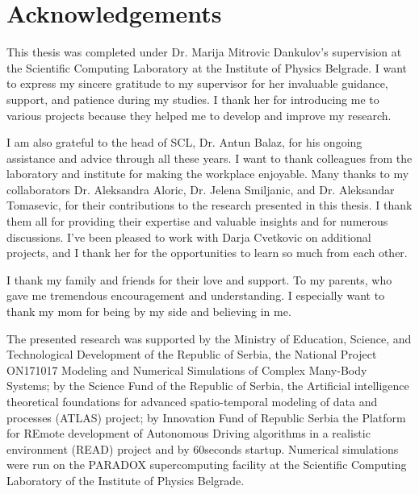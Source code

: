 
\normalsize
\chapter{Acknowledgements}

This thesis was completed under Dr. Marija Mitrovic Dankulov's supervision at the Scientific Computing Laboratory at the Institute of Physics Belgrade. I want to express my sincere gratitude to my supervisor for her invaluable guidance, support, and patience during my studies. I thank her for introducing me to various projects because they helped me to develop and improve my research. 

I am also grateful to the head of SCL, Dr. Antun Balaz, for his ongoing assistance and advice through all these years. I want to thank colleagues from the laboratory and institute for making the workplace enjoyable. Many thanks to my collaborators Dr. Aleksandra Aloric, Dr. Jelena Smiljanic, and Dr. Aleksandar Tomasevic, for their contributions to the research presented in this thesis. I thank them all for providing their expertise and valuable insights and for numerous discussions. I've been pleased to work with Darja Cvetkovic on additional projects, and I thank her for the opportunities to learn so much from each other.

I thank my family and friends for their love and support. To my parents, who gave me tremendous encouragement and understanding. I especially want to thank my mom for being by my side and believing in me.

The presented research was supported by the Ministry of Education, Science, and Technological Development of the Republic of Serbia, the National Project ON171017 Modeling and Numerical Simulations of Complex Many-Body Systems; by the Science Fund of the Republic of Serbia, the Artificial intelligence theoretical foundations for advanced spatio-temporal modeling of data and processes (ATLAS) project; by Innovation Fund of Republic Serbia the Platform for REmote development of Autonomous Driving algorithms in a realistic environment (READ) project and by 60seconds startup. Numerical simulations were run on the PARADOX supercomputing facility at the Scientific Computing Laboratory of the Institute of Physics Belgrade.

\hfill

\justify
